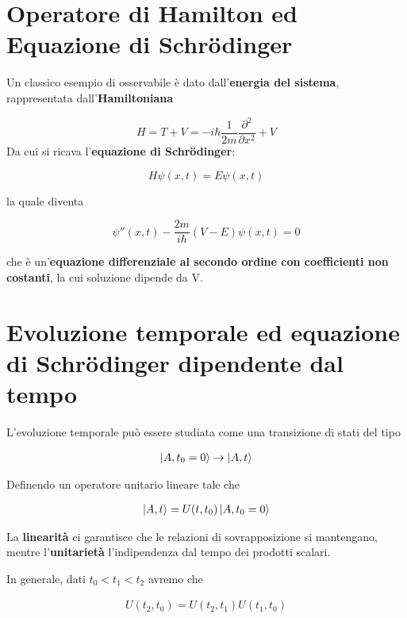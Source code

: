 \newpage
 
 
\section{Operatore di Hamilton ed Equazione di Schrödinger}
 
Un classico esempio di osservabile è dato dall'\textbf{energia del sistema}, rappresentata dall'\textbf{Hamiltoniana}

\begin{equation}
H= T + V = -i\hbar \frac{1}{2m} \frac{\partial^2}{\partial x^2} + V
\end{equation}
\newline
Da cui si ricava l'\textbf{equazione di Schrödinger}:

\begin{equation}
H\psi(x,t) = E\psi(x,t) 
\end{equation}

la quale diventa

\begin{equation}
\psi''(x,t) -\frac{2m}{i\hbar} (V-E)\psi(x,t)=0
\end{equation}

che è un'\textbf{equazione differenziale al secondo ordine con coefficienti non costanti}, la cui soluzione dipende da V. \newline


\section{Evoluzione temporale ed equazione di Schrödinger dipendente dal tempo}

L'evoluzione temporale può essere studiata come una transizione di stati del tipo

\begin{align}
\ket{A,t_0=0} \rightarrow \ket{A, t}
\end{align}

Definendo un operatore unitario lineare tale che

\begin{align}
\ket{A, t} = U(t,t_0)\ket{A, t_0=0}
\end{align}

La \textbf{linearità} ci garantisce che le relazioni di sovrapposizione si mantengano, mentre l'\textbf{unitarietà} l'indipendenza dal tempo dei prodotti scalari.

In generale, dati $t_0<t_1<t_2$ avremo che

\begin{align}
U(t_2,t_0)=U(t_2,t_1)U(t_1,t_0)
\end{align}

